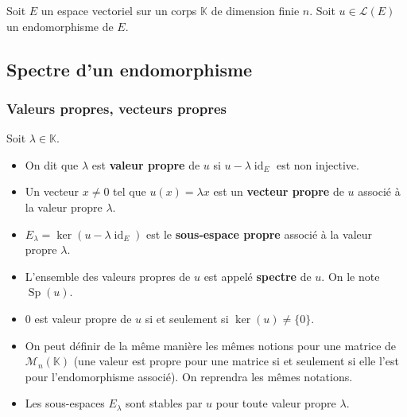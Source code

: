 




  Soit $E$ un espace vectoriel sur un corps $\mathbb{K}$ de dimension finie $n$. Soit $u \in \mathcal{L}(E)$ un endomorphisme de $E$.

  \subsection{Spectre d'un endomorphisme}

  \subsubsection{Valeurs propres, vecteurs propres}


  \begin{definition}
    Soit $\lambda \in \mathbb{K}$.
    \begin{itemize}
      \item On dit que $\lambda$ est \textbf{valeur propre} de $u$ si $u - \lambda \operatorname{id}_E$ est non injective.
      \item Un vecteur $x \neq 0$ tel que $u(x) = \lambda x$ est un \textbf{vecteur propre} de $u$ associé à la valeur propre $\lambda$.
      \item $E_\lambda = \ker(u - \lambda \operatorname{id}_E)$ est le \textbf{sous-espace propre} associé à la valeur propre $\lambda$.
      \item L'ensemble des valeurs propres de $u$ est appelé \textbf{spectre} de $u$. On le note $\operatorname{Sp}(u)$.
    \end{itemize}
  \end{definition}

  \begin{remark}
    \begin{itemize}
      \item $0$ est valeur propre de $u$ si et seulement si $\ker(u) \neq \{ 0 \}$.
      \item On peut définir de la même manière les mêmes notions pour une matrice de $\mathcal{M}_n(\mathbb{K})$ (une valeur est propre pour une matrice si et seulement si elle l'est pour l'endomorphisme associé). On reprendra les mêmes notations.
      \item Les sous-espaces $E_\lambda$ sont stables par $u$ pour toute valeur propre $\lambda$.
    \end{itemize}
  \end{remark}


